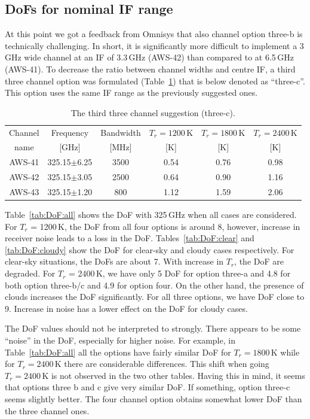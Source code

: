 \documentclass[12pt]{article}
\begin{document}
\subsection{DoFs for nominal IF range}

At this point we got a feedback from Omnisys that also channel option three-b is
technically challenging. In short, it is significantly more difficult to
implement a 3\,GHz wide channel at an IF of 3.3\,GHz (AWS-42) than compared to
at 6.5\,GHz (AWS-41). To decrease the ratio between channel widths and centre
IF, a third three channel option was formulated (Table~\ref{tab:chs:3c}) that
is below denoted as ``three-c''. This option uses the same IF range as the
previously suggested ones.

\begin{table}[!p]
  \centering  
  \begin{tabular}[c]{c|c|c|ccc}
    Channel & Frequency   & Bandwidth & $T_r=1200$\,K
    & $T_r=1800$\,K & $T_r=2400$\,K\\
    name    & [GHz] &  [MHz] & [K]  & [K] & [K]\\
    \hline
    AWS-41  & 325.15$\pm$6.25 & 3500  & 0.54 & 0.76 & 0.98\\
    AWS-42  & 325.15$\pm$3.05 & 2500  & 0.64 & 0.90 & 1.16\\
    AWS-43  & 325.15$\pm$1.20 & \phantom{0}800 & 1.12 & 1.59 & 2.06\\
    \hline
  \end{tabular}
  \caption{The third three channel suggestion (three-c).}
  \label{tab:chs:3c}
\end{table}


Table~\ref{tab:DoF:all} shows the DoF with 325\,GHz when all cases are
considered. For $T_r$ = 1200\,K, the DoF from all four options is around 8,
however, increase in receiver noise leads to a loss in the DoF.
Tables~\ref{tab:DoF:clear} and \ref{tab:DoF:cloudy} show the DoF for
clear-sky and cloudy cases respectively. For clear-sky situations, the DoFs are
about 7. With increase in $T_r$, the DoF are degraded. For $T_r$ = 2400\,K, we
have only 5 DoF for option three-a and 4.8 for both option three-b/c and 4.9
for option four. On the other hand, the presence of clouds increases the DoF
significantly. For all three options, we have DoF close to 9. Increase in noise
has a lower effect on the DoF for cloudy cases.

The DoF values should not be interpreted to strongly. There appears to be some
``noise'' in the DoF, especially for higher noise. For example, in
Table~\ref{tab:DoF:all} all the options have fairly similar DoF for
$T_r=1800$\,K while for $T_r=2400$\,K there are considerable differences. This
shift when going $T_r=2400$\,K is not observed in the two other tables. Having
this in mind, it seems that options three b and c give very similar DoF. If
something, option three-c seems slightly better. The four channel option
obtains somewhat lower DoF than the three channel ones.
\end{document}
